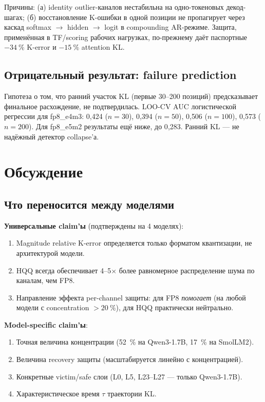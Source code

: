 \documentclass[a4paper,12pt]{article}
\begin{document}
Причины: (а) identity outlier-каналов нестабильна на одно-токеновых декод-шагах; (б) восстановление K-ошибки в одной позиции не пропагирует через каскад softmax $\to$ hidden $\to$ logit в compounding AR-режиме. Защита, применённая в TF/scoring рабочих нагрузках, по-прежнему даёт паспортные $-34~\%$ K-error и $-15~\%$ attention KL.

\subsection{Отрицательный результат: failure prediction}

Гипотеза о том, что ранний участок KL (первые 30--200 позиций) предсказывает финальное расхождение, не подтвердилась. LOO-CV AUC логистической регрессии для fp8\_e4m3: 0{,}424 ($n=30$), 0{,}394 ($n=50$), 0{,}506 ($n=100$), 0{,}573 ($n=200$). Для fp8\_e5m2 результаты ещё ниже, до 0{,}283. Ранний KL --- не надёжный детектор collapse'а.

\section{Обсуждение}

\subsection{Что переносится между моделями}

\textbf{Универсальные claim'ы} (подтверждены на 4 моделях):
\begin{enumerate}[label=\arabic*.,leftmargin=*]
\item Magnitude relative K-error определяется только форматом квантизации, не архитектурой модели.
\item HQQ всегда обеспечивает 4--5$\times$ более равномерное распределение шума по каналам, чем FP8.
\item Направление эффекта per-channel защиты: для FP8 \textit{помогает} (на любой модели с concentration $>20~\%$), для HQQ практически нейтрально.
\end{enumerate}

\textbf{Model-specific claim'ы}:
\begin{enumerate}[label=\arabic*.,leftmargin=*]
\item Точная величина концентрации (52~\% на Qwen3-1.7B, 17~\% на SmolLM2).
\item Величина recovery защиты (масштабируется линейно с концентрацией).
\item Конкретные victim/safe слои (L0, L5, L23--L27 --- только Qwen3-1.7B).
\item Характеристическое время $\tau$ траектории KL.
\end{enumerate}
\end{document}
